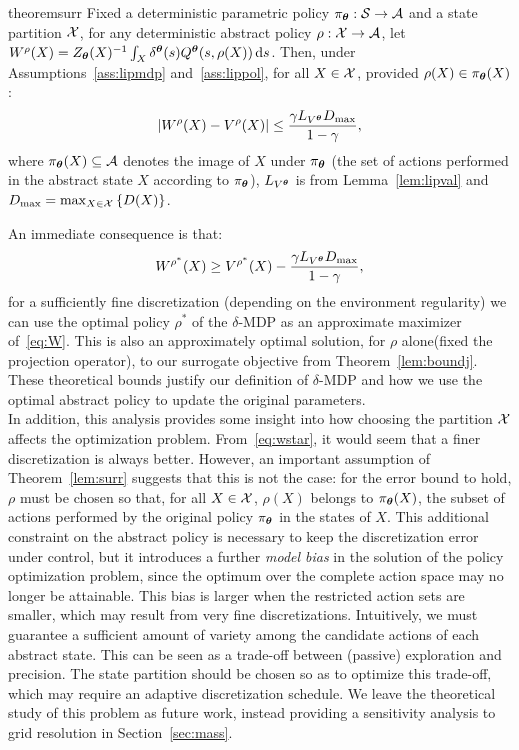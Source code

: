 %
\begin{restatable}{theorem}{surr}\label{lem:surr}
	Fixed a deterministic parametric policy ${\pi_{\boldsymbol{\theta}}:\mathcal{S}\to\mathcal{A}}$ and a state partition $\mathcal{X}$, for any deterministic abstract policy $\rho:\mathcal{X}\to\mathcal{A}$, let $W^{\rho}(X) = Z_{\boldsymbol{\theta}}(X)^{-1}\int_{X}\delta^{\boldsymbol{\theta}}(s)Q^{\boldsymbol{\theta}}(s,\rho(X))\,\mathrm{d} s$. Then, under Assumptions~\ref{ass:lipmdp} and~\ref{ass:lippol}, for all $X\in\mathcal{X}$, provided $\rho(X) \in \pi_{\boldsymbol{\theta}}(X)$:
	\begin{align*}
	|W^{\rho}(X) - V^{\rho}(X)| \leq \frac{\gamma L_{V^{\boldsymbol{\theta}}}D_{\max}}{1-\gamma},
	\end{align*}
	where $\pi_{\boldsymbol{\theta}}(X)\subseteq\mathcal{A}$ denotes the image of $X$ under $\pi_{\boldsymbol{\theta}}$ (\ie the set of actions performed in the abstract state $X$ according to $\pi_{\boldsymbol{\theta}}$), $L_{V^{\boldsymbol{\theta}}}$ is from Lemma~\ref{lem:lipval} and $D_{\max} = \max_{X\in\mathcal{X}}\left\{D(X)\right\}$.
\end{restatable}
%
\noindent An immediate consequence is that: 
\begin{align}\label{eq:wstar}
W^{\rho^*}(X) \geq V^{\rho^*}(X) - \frac{\gamma L_{V^{\boldsymbol{\theta}}}D_{\max}}{1-\gamma},
\end{align}
\ie for a sufficiently fine discretization (depending on the environment regularity) we can use the optimal policy $\rho^{*}$ of the $\delta$-\ac{MDP} as an approximate maximizer of~\eqref{eq:W}. This is also an approximately optimal solution, for $\rho$ alone(fixed the projection operator), to our surrogate objective from Theorem~\ref{lem:boundj}.
%
These theoretical bounds justify our definition of $\delta$-\ac{MDP} and how we use the optimal abstract policy to update the original parameters.\\
\newline
In addition, this analysis provides some insight into how choosing the partition $\mathcal{X}$ affects the optimization problem. From~\eqref{eq:wstar}, it would seem that a finer discretization is always better. However, an important assumption of Theorem~\ref{lem:surr} suggests that this is not the case: for the error bound to hold, $\rho$ must be chosen so that, for all $X\in\mathcal{X}$, $\rho(X)$ belongs to $\pi_{\boldsymbol{\theta}}(X)$, the subset of actions performed by the original policy $\pi_{\boldsymbol{\theta}}$ in the states of $X$. This additional constraint on the abstract policy is necessary to keep the discretization error under control, but it introduces a further \textit{model bias} in the solution of the policy optimization problem, since the optimum over the complete action space may no longer be attainable. This bias is larger when the restricted action sets are smaller, which may result from very fine discretizations. 
%
Intuitively, we must guarantee a sufficient amount of variety among the candidate actions of each abstract state. This can be seen as a trade-off between (passive) exploration and precision. The state partition should be chosen so as to optimize this trade-off, which may require an adaptive discretization schedule. We leave the theoretical study of this problem as future work, instead providing a sensitivity analysis to grid resolution in Section~\ref{sec:mass}.

